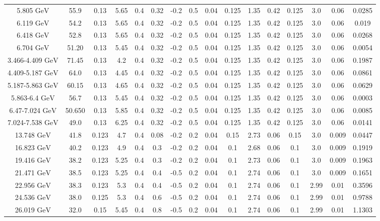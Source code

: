 \documentclass[11pt]{article}
\begin{document}
\begin{table}[htbp]
{\begin{tabular}{cccccccccccccccc}
				5.805 ${\textrm{GeV}}$ & 55.9 & 0.13 & 5.65 & 0.4 & 0.32 & -0.2 & 0.5 & 0.04 & 0.125 & 1.35 & 0.42 & 0.125 & 3.0 & 0.06 & 0.0285\\
				6.119 ${\textrm{GeV}}$ & 54.2 & 0.13 & 5.65 & 0.4 & 0.32 & -0.2 & 0.5 & 0.04 & 0.125 & 1.35 & 0.42 & 0.125 & 3.0 & 0.06 & 0.019 \\
				6.418 ${\textrm{GeV}}$ & 52.8 & 0.13 & 5.65 & 0.4 & 0.32 & -0.2 & 0.5 & 0.04 & 0.125 & 1.35 & 0.42 & 0.125 & 3.0 & 0.06 & 0.0268\\
				6.704 ${\textrm{GeV}}$ & 51.20 & 0.13 & 5.45 & 0.4 & 0.32 & -0.2 & 0.5 & 0.04 & 0.125 & 1.35 & 0.42 & 0.125 & 3.0 & 0.06 & 0.0054 \\
				\midrule			
				3.466-4.409 ${\textrm{GeV}}$ & 71.45 & 0.13 & 4.2 & 0.4 & 0.32 & -0.2 & 0.5 & 0.04 & 0.125 & 1.35 & 0.42 & 0.125 & 3.0 & 0.06 & 0.1987 \\
				4.409-5.187 ${\textrm{GeV}}$ & 64.0 & 0.13 & 4.45 & 0.4 & 0.32 & -0.2 & 0.5 & 0.04 & 0.125 & 1.35 & 0.42 & 0.125 & 3.0 & 0.06 & 0.0861 \\
				5.187-5.863 ${\textrm{GeV}}$ & 60.15 & 0.13 & 4.65 & 0.4 & 0.32 & -0.2 & 0.5 & 0.04 & 0.125 & 1.35 & 0.42 & 0.125 & 3.0 & 0.06 & 0.0629 \\
				5.863-6.4 ${\textrm{GeV}}$ & 56.7 & 0.13 & 5.45 & 0.4 & 0.32 & -0.2 & 0.5 & 0.04 & 0.125 & 1.35 & 0.42 & 0.125 & 3.0 & 0.06 & 0.0003 \\
				6.47-7.024 ${\textrm{GeV}}$ & 50.650 & 0.13 & 5.85 & 0.4 & 0.32 & -0.2 & 0.5 & 0.04 & 0.125 & 1.35 & 0.42 & 0.125 & 3.0 & 0.06 & 0.0085 \\
				7.024-7.538 ${\textrm{GeV}}$ & 49.0 & 0.13 & 6.25 & 0.4 & 0.32 & -0.2 & 0.5 & 0.04 & 0.125 & 1.35 & 0.42 & 0.125 & 3.0 & 0.06 & 0.0141 \\
				\midrule
				13.748 ${\textrm{GeV}}$ & 41.8 & 0.123 & 4.7 & 0.4 & 0.08 & -0.2 & 0.2 & 0.04 & 0.15 & 2.73 & 0.06 & 0.15 & 3.0 & 0.009 & 0.0447 \\
				16.823 ${\textrm{GeV}}$ & 40.2 & 0.123 & 4.9 & 0.4 & 0.3 & -0.2 & 0.2 & 0.04 & 0.1 & 2.68 & 0.06 & 0.1 & 3.0 & 0.009 & 0.1919 \\
				19.416 ${\textrm{GeV}}$ & 38.2 & 0.123 & 5.25 & 0.4 & 0.3 & -0.2 & 0.2 & 0.04 & 0.1 & 2.73 & 0.06 & 0.1 & 3.0 & 0.009 & 0.1963 \\
				21.471 ${\textrm{GeV}}$ & 38.5 & 0.123 & 5.25 & 0.4 & 0.4 & -0.5 & 0.2 & 0.04 & 0.1 & 2.74 & 0.06 & 0.1 & 3.0 & 0.009 & 0.1651 \\
				22.956 ${\textrm{GeV}}$ & 38.3 & 0.123 & 5.3 & 0.4 & 0.4 & -0.5 & 0.2 & 0.04 & 0.1 & 2.74 & 0.06 & 0.1 & 2.99 & 0.01 & 0.3596 \\
				24.536 ${\textrm{GeV}}$ & 38.0 & 0.125 & 5.3 & 0.4 & 0.6 & -0.5 & 0.2 & 0.04 & 0.1 & 2.74 & 0.06 & 0.1 & 2.99 & 0.01 & 0.9788 \\
				26.019 ${\textrm{GeV}}$ & 32.0 & 0.15 & 5.45 & 0.4 & 0.8 & -0.5 & 0.2 & 0.04 & 0.1 & 2.74 & 0.06 & 0.1 & 2.99 & 0.01 & 1.1303 \\
				\bottomrule
				\bottomrule
			\end{tabular}
}
\end{table}
\end{document}
